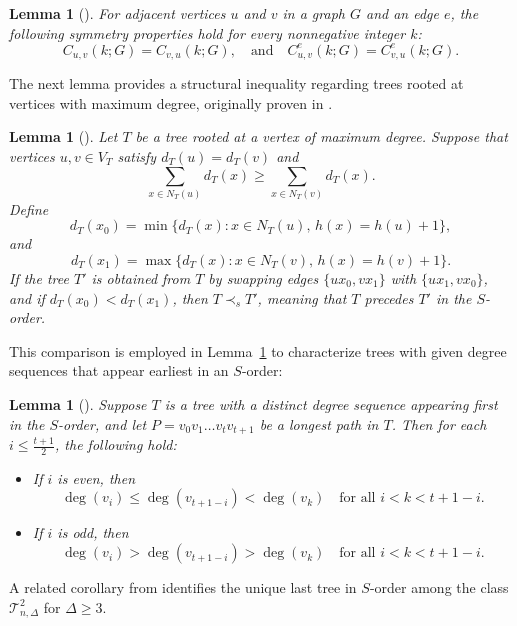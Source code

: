 \documentclass{article}
\newtheorem{lemma}[theorem]{Lemma}
\theoremstyle{definition}
\begin{document}
\begin{lemma}[\cite{Andriantiana2013WagnerEOD}]
For adjacent vertices $u$ and $v$ in a graph $G$ and an edge $e$, the following symmetry properties hold for every nonnegative integer $k$:
\[
C_{u,v}(k;G) = C_{v,u}(k;G), \quad \text{and} \quad C_{u,v}^e(k;G) = C_{v,u}^e(k;G).
\]
\end{lemma}



The next lemma provides a structural inequality regarding trees rooted at vertices with maximum degree, originally proven in \cite{ShuchaoLSYibing}.

\begin{lemma}[\cite{ShuchaoLSYibing}]\label{lemtapn1}
Let $T$ be a tree rooted at a vertex of maximum degree. Suppose that vertices $u,v \in V_T$ satisfy $d_T(u) = d_T(v)$ and
\[
\sum_{x \in N_T(u)} d_T(x) \geq \sum_{x \in N_T(v)} d_T(x).
\]
Define
\[
d_T(x_0) = \min \{ d_T(x) : x \in N_T(u), \, h(x) = h(u) + 1 \},
\]
and
\[
d_T(x_1) = \max \{ d_T(x) : x \in N_T(v), \, h(x) = h(v) + 1 \}.
\]
If the tree $T'$ is obtained from $T$ by swapping edges $\{ux_0, vx_1\}$ with $\{ux_1, vx_0\}$, and if $d_T(x_0) < d_T(x_1)$, then $T \prec_s T'$, meaning that $T$ precedes $T'$ in the $S$-order.
\end{lemma}

This comparison is employed in Lemma~\ref{lemtapn2} to characterize trees with given degree sequences that appear earliest in an $S$-order:

\begin{lemma}[\cite{Wang2016YuanHS}]\label{lemtapn2}
Suppose $T$ is a tree with a distinct degree sequence appearing first in the $S$-order, and let $P = v_0 v_1 \dots v_t v_{t+1}$ be a longest path in $T$. Then for each $i \leq \frac{t+1}{2}$, the following hold:
\begin{itemize}
  \item If $i$ is even, then 
  \[
  \deg(v_i) \leq \deg(v_{t+1 - i}) < \deg(v_k) \quad \text{for all } i < k < t+1 - i.
  \]
  \item If $i$ is odd, then
  \[
  \deg(v_i) > \deg(v_{t+1 - i}) > \deg(v_k) \quad \text{for all } i < k < t+1 - i.
  \]
\end{itemize}
\end{lemma}

A related corollary from \cite{ShuchaoLSYibing} identifies the unique last tree in $S$-order among the class $\mathscr{T}_{n,\Delta}^2$ for $\Delta \geq 3$.
\end{document}
